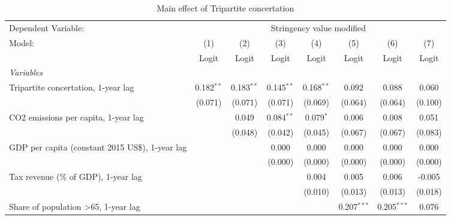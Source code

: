
\begin{table}[htbp]
   \caption{Main effect of Tripartite concertation}
   \centering
   \begin{tabular}{lccccccc}
      \toprule
      Dependent Variable: & \multicolumn{7}{c}{Stringency value modified}\\
      Model:                                                & (1)          & (2)          & (3)          & (4)          & (5)           & (6)           & (7)\\  
                                                            &  Logit       & Logit        & Logit        & Logit        & Logit         & Logit         & Logit\\  
      \midrule
      \emph{Variables}\\
      Tripartite concertation, 1-year lag                   & 0.182$^{**}$ & 0.183$^{**}$ & 0.145$^{**}$ & 0.168$^{**}$ & 0.092         & 0.088         & 0.060\\   
                                                            & (0.071)      & (0.071)      & (0.071)      & (0.069)      & (0.064)       & (0.064)       & (0.100)\\   
      CO2 emissions per capita, 1-year lag                  &              & 0.049        & 0.084$^{**}$ & 0.079$^{*}$  & 0.006         & 0.008         & 0.051\\   
                                                            &              & (0.048)      & (0.042)      & (0.045)      & (0.067)       & (0.067)       & (0.083)\\   
      GDP per capita (constant 2015 US\$), 1-year lag       &              &              & 0.000        & 0.000        & 0.000         & 0.000         & 0.000\\   
                                                            &              &              & (0.000)      & (0.000)      & (0.000)       & (0.000)       & (0.000)\\   
      Tax revenue (\% of GDP), 1-year lag                   &              &              &              & 0.004        & 0.005         & 0.006         & -0.005\\   
                                                            &              &              &              & (0.010)      & (0.013)       & (0.013)       & (0.018)\\   
      Share of population >65, 1-year lag                   &              &              &              &              & 0.207$^{***}$ & 0.205$^{***}$ & 0.076\\   

\end{tabular}
\end{table}
